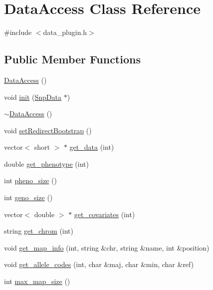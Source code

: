 \hypertarget{classDataAccess}{
\section{DataAccess Class Reference}
\label{classDataAccess}
}


{\ttfamily \#include $<$data\_\-plugin.h$>$}

\subsection*{Public Member Functions}
\begin{DoxyCompactItemize}
\item 
\hyperlink{classDataAccess_af99b77ec290d1e723d0540ba9d9a95ba}{DataAccess} ()
\item 
void \hyperlink{classDataAccess_a2a55acc88408a8b40f49e4a5330e2113}{init} (\hyperlink{classSnpData}{SnpData} $\ast$)
\item 
\hyperlink{classDataAccess_a02d65c4dff5b263dddb2d90d695fbe0e}{$\sim$DataAccess} ()
\item 
void \hyperlink{classDataAccess_a4d138b5b230fa651f3f9d7ac31ebcbc4}{setRedirectBootstrap} ()
\item 
vector$<$ short $>$ $\ast$ \hyperlink{classDataAccess_a8085d15c2180ac572bc39e937171a256}{get\_\-data} (int)
\item 
double \hyperlink{classDataAccess_a52b91927560b4221d1095d7bb0dea4b1}{get\_\-phenotype} (int)
\item 
int \hyperlink{classDataAccess_a0c3ef8b90d5b9547d9084b93f2866732}{pheno\_\-size} ()
\item 
int \hyperlink{classDataAccess_a50b8be12574c5c4f454a0bbde76e0ea2}{geno\_\-size} ()
\item 
vector$<$ double $>$ $\ast$ \hyperlink{classDataAccess_aa4ffa6d4d9cf70fb34a3ab1d8227e895}{get\_\-covariates} (int)
\item 
string \hyperlink{classDataAccess_a323b6639c751a4512cc83577715b0e80}{get\_\-chrom} (int)
\item 
void \hyperlink{classDataAccess_ac4f80d59b3ff2178f456f7907bb2479a}{get\_\-map\_\-info} (int, string \&chr, string \&name, int \&position)
\item 
void \hyperlink{classDataAccess_a7476ba5cf613f7172cc1386895c637b8}{get\_\-allele\_\-codes} (int, char \&maj, char \&min, char \&ref)
\item 
int \hyperlink{classDataAccess_a8a0848d14c6c294abdee288348a02b75}{max\_\-map\_\-size} ()
\item 

\end{DoxyCompactItemize}
